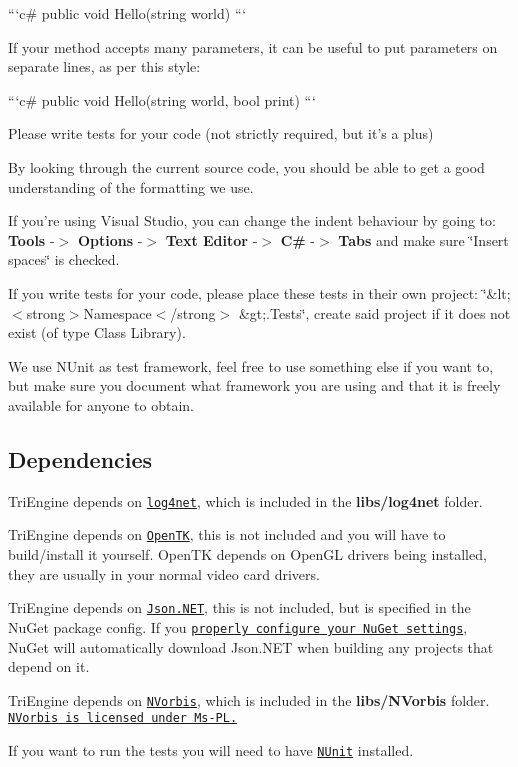 ```c\# public void Hello(string world) ```


\begin{DoxyItemize}
\item If your method accepts many parameters, it can be useful to put parameters on separate lines, as per this style\-:
\end{DoxyItemize}

```c\# public void Hello(string world, bool print) ```


\begin{DoxyItemize}
\item Please write tests for your code (not strictly required, but it's a plus)
\end{DoxyItemize}

By looking through the current source code, you should be able to get a good understanding of the formatting we use.

If you're using Visual Studio, you can change the indent behaviour by going to\-: {\bfseries Tools} -\/$>$ {\bfseries Options} -\/$>$ {\bfseries Text Editor} -\/$>$ {\bfseries C\#} -\/$>$ {\bfseries Tabs} and make sure \char`\"{}\-Insert spaces\char`\"{} is checked.

If you write tests for your code, please place these tests in their own project\-: \char`\"{}\&lt; $<$strong$>$\-Namespace$<$/strong$>$ \&gt;.\-Tests\char`\"{}, create said project if it does not exist (of type Class Library).

We use N\-Unit as test framework, feel free to use something else if you want to, but make sure you document what framework you are using and that it is freely available for anyone to obtain.

\subsection*{Dependencies}

Tri\-Engine depends on \href{http://logging.apache.org/log4net/}{\tt log4net}, which is included in the {\bfseries libs/log4net} folder.

Tri\-Engine depends on \href{http://www.opentk.com/}{\tt Open\-T\-K}, this is not included and you will have to build/install it yourself. Open\-T\-K depends on Open\-G\-L drivers being installed, they are usually in your normal video card drivers.

Tri\-Engine depends on \href{http://json.codeplex.com/}{\tt Json.\-N\-E\-T}, this is not included, but is specified in the Nu\-Get package config. If you \href{http://docs.nuget.org/docs/workflows/using-nuget-without-committing-packages#Using_NuGet_without_committing_packages_to_source_control}{\tt properly configure your Nu\-Get settings}, Nu\-Get will automatically download Json.\-N\-E\-T when building any projects that depend on it.

Tri\-Engine depends on \href{http://nvorbis.codeplex.com/}{\tt N\-Vorbis}, which is included in the {\bfseries libs/\-N\-Vorbis} folder. \href{http://nvorbis.codeplex.com/license}{\tt N\-Vorbis is licensed under Ms-\/\-P\-L.}

If you want to run the tests you will need to have \href{http://www.nunit.org/}{\tt N\-Unit} installed. 